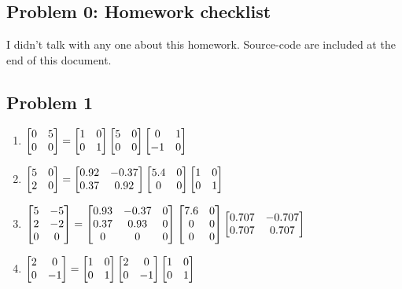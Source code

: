 \documentclass{article}
\begin{document}
 



\hypertarget{problem_0_homework_checklist_2}{}
\subsection*{{Problem 0: Homework checklist}}
\label{problem_0_homework_checklist_2}

\checkmark	I didn't talk with any one about this homework. \newline
\checkmark 	Source-code are included at the end of this document. 

\hypertarget{problem_0_homework_checklist_2}{}
\subsection*{{Problem 1}}
\label{problem_0_homework_checklist_2}

\begin{enumerate}
\item $\begin{bmatrix} 0 & 5 \\ 0 & 0 \end{bmatrix}  = \begin{bmatrix} 1 & 0 \\ 0 & 1 \end{bmatrix} \begin{bmatrix} 5 & 0 \\ 0 & 0  \end{bmatrix} \begin{bmatrix}  0 & 1 \\ -1 & 0  \end{bmatrix}$


\item $\begin{bmatrix} 5 & 0 \\ 2 & 0 \end{bmatrix} = \begin{bmatrix} 0.92 & -0.37\\ 0.37& 0.92 \end{bmatrix}\begin{bmatrix} 5.4& 0\\ 0& 0 \end{bmatrix} \begin{bmatrix} 1 & 0 \\0 & 1 \end{bmatrix} $


\item $\begin{bmatrix} 5 & -5 \\ 2 & -2 \\ 0 & 0 \end{bmatrix}= \begin{bmatrix} 0.93 & -0.37 & 0 \\ 0.37 & 0.93 & 0 \\ 0 & 0 & 0  \end{bmatrix}\begin{bmatrix} 7.6 & 0 \\ 0 & 0 \\ 0 & 0  \end{bmatrix}
\begin{bmatrix} 0.707 & -0.707 \\ 0.707 & 0.707  \end{bmatrix} $


\item $\begin{bmatrix} 2 & 0 \\ 0 & -1 \end{bmatrix} = \begin{bmatrix} 1 & 0 \\ 0 & 1 \end{bmatrix} \begin{bmatrix} 2 & 0 \\ 0 & -1  \end{bmatrix} \begin{bmatrix} 1 & 0 \\ 0 & 1  \end{bmatrix}$

\end{enumerate}
\end{document}
